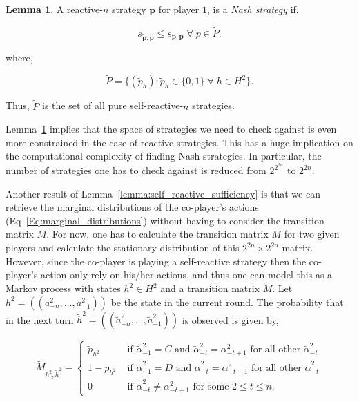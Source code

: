 \documentclass{article}
\theoremstyle{definition}
\newtheorem{lemma}[theorem]{Lemma}
\begin{document}
\begin{lemma}\label{lemma:nash_against_pure_self_reactive}
A reactive-$n$ strategy $\mathbf{p}$ for player $1$, is a \textit{Nash strategy} if,

\begin{equation}\label{Eq:NashReactive}
    s_{\mathbf{\tilde{p}}, \mathbf{p}} \leq s_{\mathbf{p},\mathbf{p}} \;\forall \; \tilde{p} \in \tilde{P}.
\end{equation}

where,

$$\tilde{P} = \{(\tilde{p}_h): \tilde{p}_h \in \{0, 1\} \; \forall \; h \in H^2\}.$$

Thus, $\tilde{P}$ is the set of all pure self-reactive-$n$ strategies.
\end{lemma}

Lemma~\ref{lemma:nash_against_pure_self_reactive} implies that the space
of strategies we need to check against is even more constrained in the
case of reactive strategies. This has a huge implication on the computational
complexity of finding Nash strategies. In particular, the number of strategies
one has to check against is reduced from $2^{2^{2n}}$ to $2^{2n}$.

Another result of Lemma~\ref{lemma:self_reactive_sufficiency} is that we can
retrieve the marginal distributions of the co-player's actions
(Eq~\eqref{Eq:marginal_distributions}) without having to consider the transition
matrix $M$. For now, one has to calculate the transition matrix \(M\) for two
given players and calculate the stationary distribution of this $2^{2n} \times
2^{2n}$ matrix. However, since the co-player is playing a self-reactive strategy
then the co-player's action only rely on his/her actions, and thus one can model
this as a Markov process with states $h^2 \in H^2$ and a transition matrix
\(\tilde{M}\). Let \(h^2=((a^2_{-n},\ldots,a^2_{-1}))\) be the state in the
current round. The probability that in the next turn
\(\tilde{h}^2=((\tilde{a}^2_{-n},\ldots,\tilde{a}^2_{-1}))\) is observed is
given by,

$$
\tilde{M}_{h^2, \tilde{h}^2} = 
\begin{cases}
  \tilde{p}_{h^2} & \text{ if } \tilde{\alpha}^2_{-1} = C \text{ and } \tilde{\alpha}^2_{-t} = \alpha^2_{-t + 1} \text{ for all other } \tilde{\alpha}^2_{-t}\\
  1 - \tilde{p}_{h^2} & \text{ if } \tilde{\alpha}^2_{-1} = D \text{ and } \tilde{\alpha}^2_{-t} = \alpha^2_{-t + 1} \text{ for all other } \tilde{\alpha}^2_{-t}\\
  0 & \text{ if } \tilde{\alpha}^2_{-t} \neq  \alpha^2_{-t + 1} \text{ for some } 2 \leq t \leq n.
\end{cases}
$$
\end{document}
